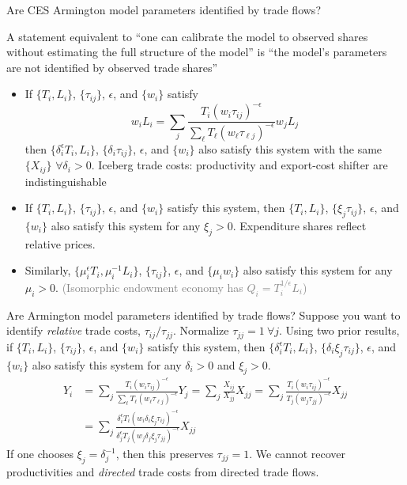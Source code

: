 \documentclass[11pt,notes=hide,aspectratio=169]{beamer}
\begin{document}
\begin{frame}{Are CES Armington model parameters identified by trade flows?}
{\small
A statement equivalent to
``one can calibrate the model to observed shares without estimating the full structure of the model''
is
``the model's parameters are not identified by observed trade shares''
\begin{itemize}
\item
If $\{T_i,L_i\}$, $\{\tau_{ij}\}$, $\epsilon$, and $\{w_i\}$ satisfy
$$
w_i L_i
=
\sum_j \frac{T_i \left(w_i \tau_{ij}\right)^{-\epsilon}}{\sum_{\ell} T_{\ell} \left(w_{\ell} \tau_{\ell j}\right)^{-\epsilon}}
w_j L_j
$$
then
$\{\delta_i^{\epsilon}T_i,L_i\}$, $\{\delta_i\tau_{ij}\}$, $\epsilon$, and $\{w_i\}$
also satisfy this system with the same $\{X_{ij}\}$
$\forall \delta_{i} > 0$.
Iceberg trade costs: productivity and export-cost shifter are indistinguishable
\item
If $\{T_i,L_i\}$, $\{\tau_{ij}\}$, $\epsilon$, and $\{w_i\}$ satisfy this system,
then
$\{T_i,L_i\}$, $\{\xi_j \tau_{ij}\}$, $\epsilon$, and $\{w_i\}$ 
also satisfy this system
for any $\xi_j > 0$.
Expenditure shares reflect relative prices.
\item
Similarly,
$\{\mu_{i}^{\epsilon}T_i,\mu_{i}^{-1} L_i\}$, $\{\tau_{ij}\}$, $\epsilon$, and $\{\mu_{i}w_i\}$
also satisfy this system
for any $\mu_{i} > 0$.
\textcolor{gray}{(Isomorphic endowment economy has $Q_i = T_i^{1/\epsilon} L_i$)}
\end{itemize}
}
\end{frame}
\begin{frame}{Are  Armington model parameters identified by trade flows?}
Suppose you want to identify \textit{relative} trade costs, $\tau_{ij} / \tau_{jj}$.
Normalize $\tau_{jj} = 1 \ \forall j$.
\medskip
Using two prior results,
if $\{T_i,L_i\}$, $\{\tau_{ij}\}$, $\epsilon$, and $\{w_i\}$ satisfy this system,
then
$\{\delta_i^{\epsilon} T_i,L_i\}$, $\{\delta_i \xi_j \tau_{ij}\}$, $\epsilon$, and $\{w_i\}$
also satisfy this system
for any $\delta_{i} > 0$ and $\xi_j > 0$.
\begin{align*}
Y_i
&=
\sum_j \frac{T_i \left(w_i \tau_{ij}\right)^{-\epsilon}}{\sum_{\ell} T_{\ell} \left(w_{\ell} \tau_{\ell j}\right)^{-\epsilon}}
Y_j
=
\sum_j \frac{X_{ij}}{X_{jj}} 
X_{jj}
=
\sum_j \frac{T_i \left(w_i \tau_{ij}\right)^{-\epsilon}}{T_j \left(w_j \tau_{jj}\right)^{-\epsilon}}
X_{jj}
\\
&=
\sum_j \frac{\delta_i^{\epsilon}T_i \left(w_i \delta_i \xi_j\tau_{ij}\right)^{-\epsilon}}{\delta_j^{\epsilon}T_j \left(w_j \delta_j \xi_j \tau_{jj}\right)^{-\epsilon}}
X_{jj}
\end{align*}
If one chooses $\xi_j = \delta^{-1}_j$, then this preserves $\tau_{jj} = 1$.
\medskip
We cannot recover productivities and \textit{directed} trade costs from directed trade flows.
\end{frame}
\end{document}

